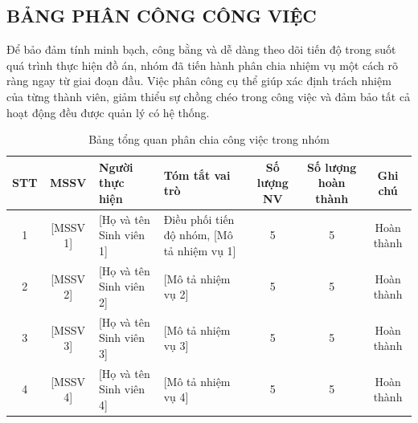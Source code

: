 \clearpage
\pagestyle{appendixlandscape}
\markboth{}{}

\begin{landscape}
\chapter{BẢNG PHÂN CÔNG CÔNG VIỆC}

Để bảo đảm tính minh bạch, công bằng và dễ dàng theo dõi tiến độ trong suốt quá trình thực hiện đồ án,
nhóm đã tiến hành phân chia nhiệm vụ một cách rõ ràng ngay từ giai đoạn đầu. Việc phân công cụ thể
giúp xác định trách nhiệm của từng thành viên, giảm thiểu sự chồng chéo trong công việc và đảm bảo
tất cả hoạt động đều được quản lý có hệ thống.

\begin{table}[htbp]
    \caption{Bảng tổng quan phân chia công việc trong nhóm}
    \centering
    \begin{tabularx}{\linewidth}{@{} c c X X c c c @{}}
    \toprule
    \textbf{STT} & \textbf{MSSV} & \textbf{Người thực hiện} & \textbf{Tóm tắt vai trò} &
    \textbf{Số lượng NV} & \textbf{Số lượng hoàn thành} & \textbf{Ghi chú} \\
    \midrule
    1 & [MSSV 1] & [Họ và tên Sinh viên 1] & Điều phối tiến độ nhóm, [Mô tả nhiệm vụ 1] & 5 & 5 & Hoàn thành \\[4pt]
    2 & [MSSV 2] & [Họ và tên Sinh viên 2] & [Mô tả nhiệm vụ 2] & 5 & 5 & Hoàn thành \\[4pt]
    3 & [MSSV 3] & [Họ và tên Sinh viên 3] & [Mô tả nhiệm vụ 3] & 5 & 5 & Hoàn thành \\[4pt]
    4 & [MSSV 4] & [Họ và tên Sinh viên 4] & [Mô tả nhiệm vụ 4] & 5 & 5 & Hoàn thành \\[4pt]
    \bottomrule
    \end{tabularx}
\end{table}
\end{landscape}

\clearpage
